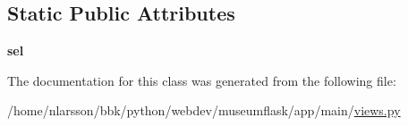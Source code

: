 \subsection*{Static Public Attributes}
\begin{DoxyCompactItemize}
\item 
\mbox{\label{classapp_1_1main_1_1views_1_1AppConfiguration_af16d50d7f35a12e5231e85f3a785301a}} 
{\bfseries sel}
\end{DoxyCompactItemize}


The documentation for this class was generated from the following file\+:\begin{DoxyCompactItemize}
\item 
/home/nlarsson/bbk/python/webdev/museumflask/app/main/\mbox{\hyperlink{views_8py}{views.\+py}}\end{DoxyCompactItemize}
